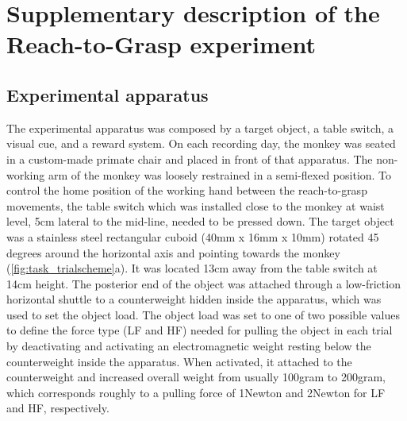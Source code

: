 
\chapter{Supplementary description of the Reach-to-Grasp experiment}
\label{sec:R2G_suppl}

\section{Experimental apparatus}
\label{sec:experimental_apparatus}

The experimental apparatus was composed by a target object, a table switch, a visual cue, and a reward system. On each recording day, the monkey was seated in a custom-made primate chair and placed in front of that apparatus. The non-working arm of the monkey was loosely restrained in a semi-flexed position. To control the home position of the working hand between the reach-to-grasp movements, the table switch which was installed close to the monkey at waist level, 5cm lateral to the mid-line, needed to be pressed down. The target object was a stainless steel rectangular cuboid (40mm x 16mm x 10mm) rotated 45 degrees around the horizontal axis and pointing towards the monkey (\cref{fig:task_trialscheme}a). It was located 13cm away from the table switch at 14cm height. The posterior end of the object was attached through a low-friction horizontal shuttle to a counterweight hidden inside the apparatus, which was used to set the object load. The object load was set to one of two possible values to define the force type (LF and HF) needed for pulling the object in each trial by deactivating and activating an electromagnetic weight resting below the counterweight inside the apparatus. When activated, it attached to the counterweight and increased overall weight from usually 100gram to 200gram, which corresponds roughly to a pulling force of 1Newton and 2Newton for LF and HF, respectively. 

